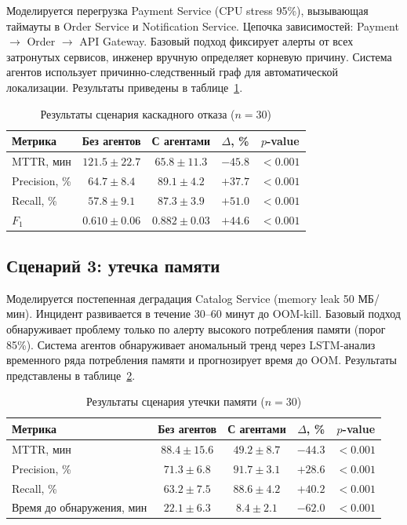 Моделируется перегрузка Payment Service (CPU stress 95\%), вызывающая таймауты в Order Service и Notification Service. Цепочка зависимостей: Payment $\to$ Order $\to$ API Gateway. Базовый подход фиксирует алерты от всех затронутых сервисов, инженер вручную определяет корневую причину. Система агентов использует причинно-следственный граф для автоматической локализации. Результаты приведены в таблице~\ref{tab:scenario2_results}.

\begin{table}[H]
\centering
\small
\caption{Результаты сценария каскадного отказа ($n = 30$)}
\label{tab:scenario2_results}
\begin{tabular}{|l|c|c|c|c|}
\hline
\textbf{Метрика} & \textbf{Без агентов} & \textbf{С агентами} & \textbf{$\Delta$, \%} & \textbf{$p$-value} \\
\hline
MTTR, мин & $121.5 \pm 22.7$ & $65.8 \pm 11.3$ & $-45.8$ & $< 0.001$ \\
\hline
Precision, \% & $64.7 \pm 8.4$ & $89.1 \pm 4.2$ & $+37.7$ & $< 0.001$ \\
\hline
Recall, \% & $57.8 \pm 9.1$ & $87.3 \pm 3.9$ & $+51.0$ & $< 0.001$ \\
\hline
$F_1$ & $0.610 \pm 0.06$ & $0.882 \pm 0.03$ & $+44.6$ & $< 0.001$ \\
\hline
\end{tabular}
\end{table}

\subsection{Сценарий 3: утечка памяти}

Моделируется постепенная деградация Catalog Service (memory leak 50 МБ/мин). Инцидент развивается в течение 30--60 минут до OOM-kill. Базовый подход обнаруживает проблему только по алерту высокого потребления памяти (порог 85\%). Система агентов обнаруживает аномальный тренд через LSTM-анализ временного ряда потребления памяти и прогнозирует время до OOM. Результаты представлены в таблице~\ref{tab:scenario3_results}.

\begin{table}[H]
\centering
\small
\caption{Результаты сценария утечки памяти ($n = 30$)}
\label{tab:scenario3_results}
\begin{tabular}{|l|c|c|c|c|}
\hline
\textbf{Метрика} & \textbf{Без агентов} & \textbf{С агентами} & \textbf{$\Delta$, \%} & \textbf{$p$-value} \\
\hline
MTTR, мин & $88.4 \pm 15.6$ & $49.2 \pm 8.7$ & $-44.3$ & $< 0.001$ \\
\hline
Precision, \% & $71.3 \pm 6.8$ & $91.7 \pm 3.1$ & $+28.6$ & $< 0.001$ \\
\hline
Recall, \% & $63.2 \pm 7.5$ & $88.6 \pm 4.2$ & $+40.2$ & $< 0.001$ \\
\hline
Время до обнаружения, мин & $22.1 \pm 6.3$ & $8.4 \pm 2.1$ & $-62.0$ & $< 0.001$ \\
\hline
\end{tabular}
\end{table}

